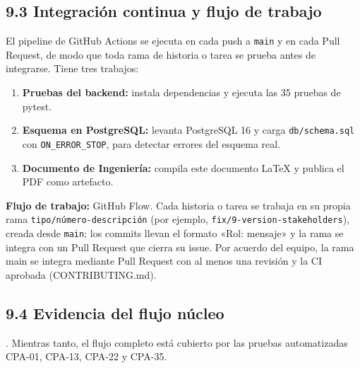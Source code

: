 \subsection{9.3 Integración continua y flujo de
trabajo}\label{integraciuxf3n-continua-y-flujo-de-trabajo}

El pipeline de GitHub Actions se ejecuta en cada push a \texttt{main} y en cada Pull Request, de modo que
toda rama de historia o tarea se prueba antes de integrarse. Tiene tres trabajos:

\begin{enumerate}
\tightlist
\item \textbf{Pruebas del backend:} instala dependencias y ejecuta las 35 pruebas de pytest.
\item \textbf{Esquema en PostgreSQL:} levanta PostgreSQL 16 y carga \texttt{db/schema.sql} con
\texttt{ON\_ERROR\_STOP}, para detectar errores del esquema real.
\item \textbf{Documento de Ingeniería:} compila este documento LaTeX y publica el PDF como artefacto.
\end{enumerate}

\textbf{Flujo de trabajo:} GitHub Flow. Cada historia o tarea se trabaja en su propia rama
\texttt{tipo/número-descripción} (por ejemplo, \texttt{fix/9-version-stakeholders}), creada desde
\texttt{main}; los commits llevan el formato «Rol: mensaje» y la rama se integra con un Pull Request que
cierra su issue.
Por acuerdo del equipo, la rama main se integra mediante Pull Request con al menos una revisión y la CI aprobada
(CONTRIBUTING.md).


\subsection{9.4 Evidencia del flujo
núcleo}\label{evidencia-del-flujo-nuxfacleo}

\pendiente{}.
Mientras tanto, el flujo completo está cubierto por las pruebas automatizadas CPA-01, CPA-13, CPA-22 y
CPA-35.


